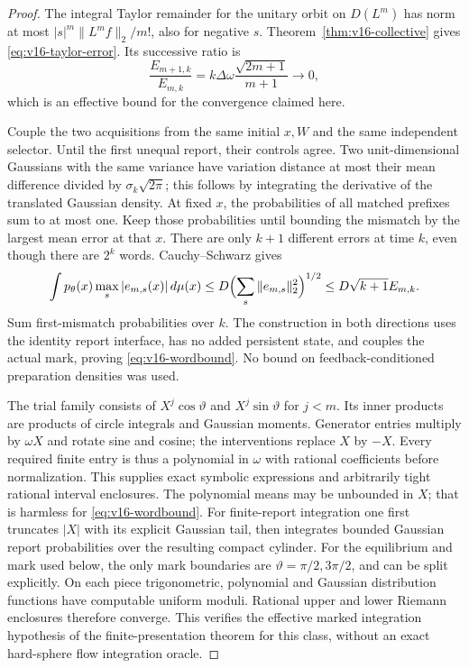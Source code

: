 \begin{proof}
The integral Taylor remainder for the unitary orbit on $D(L^m)$ has
norm at most $|s|^m\|L^mf\|_2/m!$, also for negative $s$.
Theorem~\ref{thm:v16-collective} gives \eqref{eq:v16-taylor-error}.
Its successive ratio is
\[
 \frac{E_{m+1,k}}{E_{m,k}}
       =k\Delta\omega\frac{\sqrt{2m+1}}{m+1}\longrightarrow0,
\]
which is an effective bound for the convergence claimed here.

Couple the two acquisitions from the same initial $x,W$ and the same
independent selector. Until the first unequal report, their controls
agree. Two unit-dimensional Gaussians with the same variance have
variation distance at most their mean difference divided by
$\sigma_k\sqrt{2\pi}$; this follows by integrating the derivative of
the translated Gaussian density. At fixed $x$, the probabilities of
all matched prefixes sum to at most one. Keep those probabilities
until bounding the mismatch by the largest mean error at that $x$.
There are only $k+1$ different errors at time $k$, even though there
are $2^k$ words. Cauchy--Schwarz gives
\[
 \int p_\theta(x)\max_s|e_{m,s}(x)|\,d\mu(x)
 \le D\Bigl(\sum_s\|e_{m,s}\|_2^2\Bigr)^{1/2}
 \le D\sqrt{k+1}E_{m,k}.
\]
Sum first-mismatch probabilities over $k$. The construction in both
directions uses the identity report interface, has no added persistent
state, and couples the actual mark, proving \eqref{eq:v16-wordbound}.
No bound on feedback-conditioned preparation densities was used.

The trial family consists of $X^j\cos\vartheta$ and
$X^j\sin\vartheta$ for $j<m$. Its inner products are products of
circle integrals and Gaussian moments. Generator entries multiply by
$\omega X$ and rotate sine and cosine; the interventions replace $X$
by $-X$. Every required finite entry is thus a polynomial in $\omega$
with rational coefficients before normalization. This supplies exact
symbolic expressions and arbitrarily tight rational interval enclosures.
The polynomial means may be unbounded in $X$; that is harmless for
\eqref{eq:v16-wordbound}. For finite-report integration one first
truncates $|X|$ with its explicit Gaussian tail, then integrates bounded
Gaussian report probabilities over the resulting compact cylinder.
For the equilibrium and mark used below, the only mark boundaries are
$\vartheta=\pi/2,3\pi/2$, and can be split explicitly. On each piece
trigonometric, polynomial and Gaussian distribution functions have
computable uniform moduli. Rational upper and lower Riemann enclosures
therefore converge. This verifies the effective marked integration
hypothesis of the finite-presentation theorem for this class, without
an exact hard-sphere flow integration oracle.
\end{proof}

